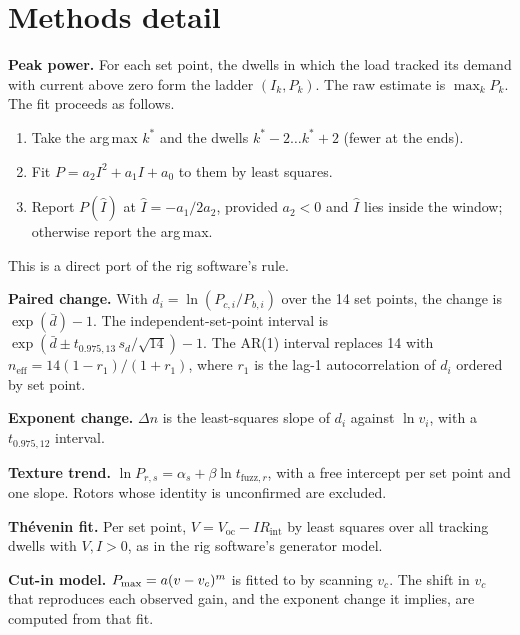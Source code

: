 \documentclass[11pt]{article}
\begin{document}
\begin{table}[h]
\centering\footnotesize
\caption{Thévenin fit per set point: open-circuit voltage $V_\mathrm{oc}$ (V) and apparent source
resistance $R_\mathrm{int}$ (\si{\ohm}).}\label{tab:thevenin}
\setlength{\tabcolsep}{4.5pt}

\end{table}

\section{Methods detail}\label{app:methods}
\textbf{Peak power.} For each set point, the dwells in which the load tracked its demand with
current above zero form the ladder $(I_k, P_k)$. The raw estimate is $\max_k P_k$. The fit
proceeds as follows.
\begin{enumerate}
  \item Take the arg\,max $k^*$ and the dwells $k^*-2 \dots k^*+2$ (fewer at the ends).
  \item Fit $P = a_2I^2 + a_1I + a_0$ to them by least squares.
  \item Report $P(\hat I)$ at $\hat I = -a_1/2a_2$, provided $a_2<0$ and $\hat I$ lies inside
        the window; otherwise report the arg\,max.
\end{enumerate}
This is a direct port of the rig software's rule.

\textbf{Paired change.} With $d_i = \ln(P_{c,i}/P_{b,i})$ over the 14 set points, the change
is $\exp(\bar d)-1$. The independent-set-point interval is
$\exp(\bar d \pm t_{0.975,13}\, s_d/\sqrt{14})-1$. The AR(1) interval replaces 14 with
$n_\text{eff} = 14(1-r_1)/(1+r_1)$, where $r_1$ is the lag-1 autocorrelation of $d_i$ ordered
by set point.

\textbf{Exponent change.} $\Delta n$ is the least-squares slope of $d_i$ against $\ln v_i$,
with a $t_{0.975,12}$ interval.

\textbf{Texture trend.} $\ln P_{r,s} = \alpha_s + \beta \ln t_{\text{fuzz},r}$, with a free
intercept per set point and one slope. Rotors whose identity is unconfirmed are excluded.

\textbf{Thévenin fit.} Per set point, $V = V_\mathrm{oc} - I R_\mathrm{int}$ by least squares over all
tracking dwells with $V, I > 0$, as in the rig software's generator model.

\textbf{Cut-in model.} $P_{\max}=a(v-v_c)^m$ is fitted to  by scanning $v_c$. The shift in
$v_c$ that reproduces each observed gain, and the exponent change it implies, are computed
from that fit.
\end{document}
